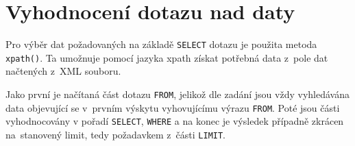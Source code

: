 \documentclass[10pt,a4paper,final]{article}
\begin{document}
  \section{Vyhodnocení dotazu nad daty} \label{vyhodnoceni-dotazu}

    Pro výběr dat požadovaných na základě \texttt{SELECT} dotazu je použita 
    metoda \texttt{xpath()}. Ta umožnuje pomocí jazyka xpath získat potřebná
    data z~pole dat načtených z~XML souboru.
    
    Jako první je načítaná část dotazu \texttt{FROM}, jelikož dle zadání
    jsou vždy vyhledávána data objevující se v~prvním výskytu vyhovujícímu
    výrazu \texttt{FROM}. Poté jsou části vyhodnocovány v pořadí
    \texttt{SELECT}, \texttt{WHERE} a na konec je výsledek případně zkrácen 
    na~stanovený limit, tedy požadavkem z~části \texttt{LIMIT}.
    
    
\end{document}
